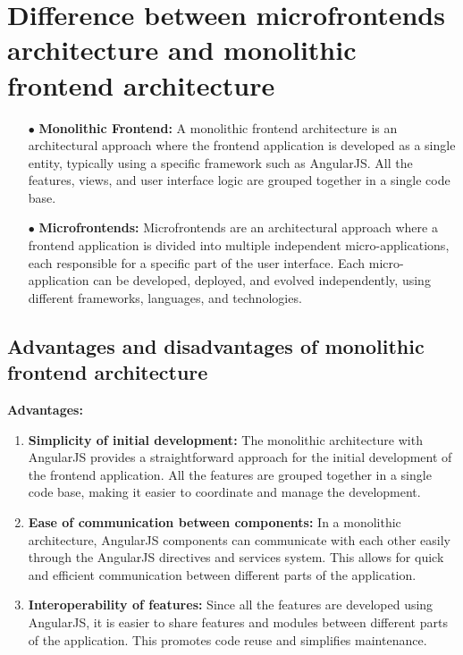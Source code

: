 \section{Difference between microfrontends architecture and monolithic frontend architecture}
\begin{enumerate}
\item[$\bullet$] \textbf{Monolithic Frontend:} A monolithic frontend architecture is an architectural approach where the frontend application is developed as a single entity, typically using a specific framework such as AngularJS. All the features, views, and user interface logic are grouped together in a single code base.
\item[$\bullet$] \textbf{Microfrontends:} Microfrontends are an architectural approach where a frontend application is divided into multiple independent micro-applications, each responsible for a specific part of the user interface. Each micro-application can be developed, deployed, and evolved independently, using different frameworks, languages, and technologies.
\end{enumerate}

\subsection{Advantages and disadvantages of monolithic frontend architecture}
\textbf{Advantages:}
\begin{enumerate}
\item \textbf{Simplicity of initial development:} The monolithic architecture with AngularJS provides a straightforward approach for the initial development of the frontend application. All the features are grouped together in a single code base, making it easier to coordinate and manage the development.
\item \textbf{Ease of communication between components:} In a monolithic architecture, AngularJS components can communicate with each other easily through the AngularJS directives and services system. This allows for quick and efficient communication between different parts of the application.
\item \textbf{Interoperability of features:} Since all the features are developed using AngularJS, it is easier to share features and modules between different parts of the application. This promotes code reuse and simplifies maintenance.
\end{enumerate}


